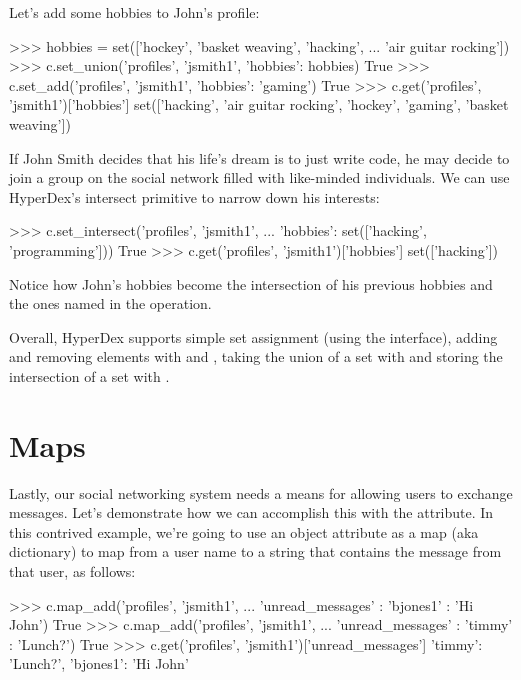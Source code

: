 Let's add some hobbies to John's profile:

\begin{pythoncode}
>>> hobbies = set(['hockey', 'basket weaving', 'hacking',
...                'air guitar rocking'])
>>> c.set_union('profiles', 'jsmith1', {'hobbies': hobbies})
True
>>> c.set_add('profiles', 'jsmith1', {'hobbies': 'gaming'})
True
>>> c.get('profiles', 'jsmith1')['hobbies']
set(['hacking', 'air guitar rocking', 'hockey', 'gaming', 'basket weaving'])
\end{pythoncode}

If John Smith decides that his life's dream is to just write code, he may decide
to join a group on the social network filled with like-minded individuals.  We
can use HyperDex's intersect primitive to narrow down his interests:

\begin{pythoncode}
>>> c.set_intersect('profiles', 'jsmith1',
...                 {'hobbies': set(['hacking', 'programming'])})
True
>>> c.get('profiles', 'jsmith1')['hobbies']
set(['hacking'])
\end{pythoncode}

Notice how John's hobbies become the intersection of his previous hobbies and
the ones named in the operation.

Overall, HyperDex supports simple set assignment (using the 
interface), adding and removing elements with  and
, taking the union of a set with  and storing
the intersection of a set with .

\section{Maps}

Lastly, our social networking system needs a means for allowing users to
exchange messages.  Let's demonstrate how we can accomplish this with the
 attribute. In this contrived example, we're going to use
an object attribute as a map (aka dictionary) to map from a user name to a
string that contains the message from that user, as follows:

\begin{pythoncode}
>>> c.map_add('profiles', 'jsmith1',
...           {'unread_messages' : {'bjones1' : 'Hi John'}})
True
>>> c.map_add('profiles', 'jsmith1',
...           {'unread_messages' : {'timmy' : 'Lunch?'}})
True
>>> c.get('profiles', 'jsmith1')['unread_messages']
{'timmy': 'Lunch?', 'bjones1': 'Hi John'}
\end{pythoncode}

